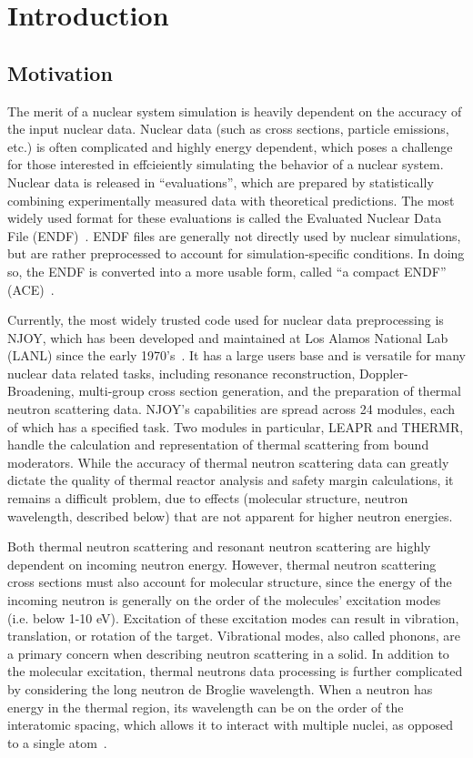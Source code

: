 \documentclass[../master.tex]{subfiles}
\begin{document}
\chapter{Introduction}

	\section{Motivation}\label{sec:motivation}
		The merit of a nuclear system simulation is heavily dependent on the accuracy of the input nuclear data. Nuclear data (such as cross sections, particle emissions, etc.) is often complicated and highly energy dependent, which poses a challenge for those interested in effcieiently simulating the behavior of a nuclear system. Nuclear data is released in ``evaluations'', which are prepared by statistically combining experimentally measured data with theoretical predictions. The most widely used format for these evaluations is called the Evaluated Nuclear Data File (ENDF)~\cite{endfManual}. ENDF files are generally not directly used by nuclear simulations, but are rather preprocessed to account for simulation-specific conditions. In doing so, the ENDF is converted into a more usable form, called ``a compact ENDF'' (ACE)~\cite{ace}.\par
		
		Currently, the most widely trusted code used for nuclear data preprocessing is NJOY, which has been developed and maintained at Los Alamos National Lab (LANL) since the early 1970's~\cite{njoy}. It has a large users base and is versatile for many nuclear data related tasks, including resonance reconstruction, Doppler-Broadening, multi-group cross section generation, and the preparation of thermal neutron scattering data. NJOY's capabilities are spread across 24 modules, each of which has a specified task. Two modules in particular, LEAPR and THERMR, handle the calculation and representation of thermal scattering from bound moderators. While the accuracy of thermal neutron scattering data can greatly dictate the quality of thermal reactor analysis and safety margin calculations, it remains a difficult problem, due to effects (molecular structure, neutron wavelength, described below) that are not apparent for higher neutron energies. \par

		Both thermal neutron scattering and resonant neutron scattering are highly dependent on incoming neutron energy. However, thermal neutron scattering cross sections must also account for molecular structure, since the energy of the incoming neutron is generally on the order of the molecules' excitation modes (i.e. below 1-10 eV). Excitation of these excitation modes can result in vibration, translation, or rotation of the target. Vibrational modes, also called phonons, are a primary concern when describing neutron scattering in a solid. In addition to the molecular excitation, thermal neutrons data processing is further complicated by considering the long neutron de Broglie wavelength. When a neutron has energy in the thermal region, its wavelength can be on the order of the interatomic spacing, which allows it to interact with multiple nuclei, as opposed to a single atom~\cite{jesseholmes}. 
\end{document}
